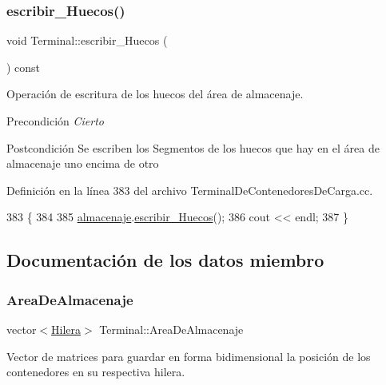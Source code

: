 \subsubsection{\texorpdfstring{escribir\+\_\+\+Huecos()}{escribir\_Huecos()}}
{\footnotesize\ttfamily void Terminal\+::escribir\+\_\+\+Huecos (\begin{DoxyParamCaption}{ }\end{DoxyParamCaption}) const}



Operación de escritura de los huecos del área de almacenaje. 

\begin{DoxyPrecond}{Precondición}
{\itshape Cierto} 
\end{DoxyPrecond}
\begin{DoxyPostcond}{Postcondición}
Se escriben los Segmentos de los huecos que hay en el área de almacenaje uno encima de otro 
\end{DoxyPostcond}


Definición en la línea 383 del archivo Terminal\+De\+Contenedores\+De\+Carga.\+cc.


\begin{DoxyCode}
383                                      \{
384     
385     \hyperlink{class_terminal_a1d87d7b16c4f460eee6f1ab73da90fd2}{almacenaje}.\hyperlink{class_almacenaje_a29e009f94265ea34b860f0918d3e1992}{escribir\_Huecos}();
386     cout << endl;
387 \}
\end{DoxyCode}


\subsection{Documentación de los datos miembro}
\mbox{\label{class_terminal_a50670862a5cdeb0504efd1c45b6416dc}} 
\subsubsection{\texorpdfstring{Area\+De\+Almacenaje}{AreaDeAlmacenaje}}
{\footnotesize\ttfamily vector$<$\hyperlink{class_terminal_aba85ff115aaa21fc79271673ad4231b9}{Hilera}$>$ Terminal\+::\+Area\+De\+Almacenaje\hspace{0.3cm}{\ttfamily [private]}}



Vector de matrices para guardar en forma bidimensional la posición de los contenedores en su respectiva hilera. 



